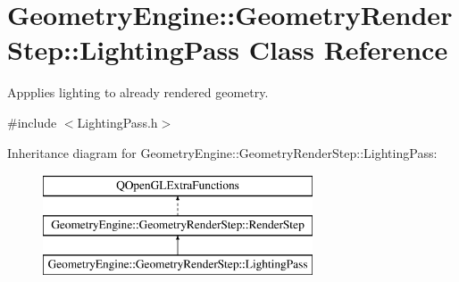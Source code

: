 \hypertarget{class_geometry_engine_1_1_geometry_render_step_1_1_lighting_pass}{}\section{Geometry\+Engine\+::Geometry\+Render\+Step\+::Lighting\+Pass Class Reference}
\label{class_geometry_engine_1_1_geometry_render_step_1_1_lighting_pass}


Appplies lighting to already rendered geometry.  




{\ttfamily \#include $<$Lighting\+Pass.\+h$>$}

Inheritance diagram for Geometry\+Engine\+::Geometry\+Render\+Step\+::Lighting\+Pass\+:\begin{figure}[H]
\begin{center}
\leavevmode
\includegraphics[height=3.000000cm]{class_geometry_engine_1_1_geometry_render_step_1_1_lighting_pass}
\end{center}
\end{figure}
